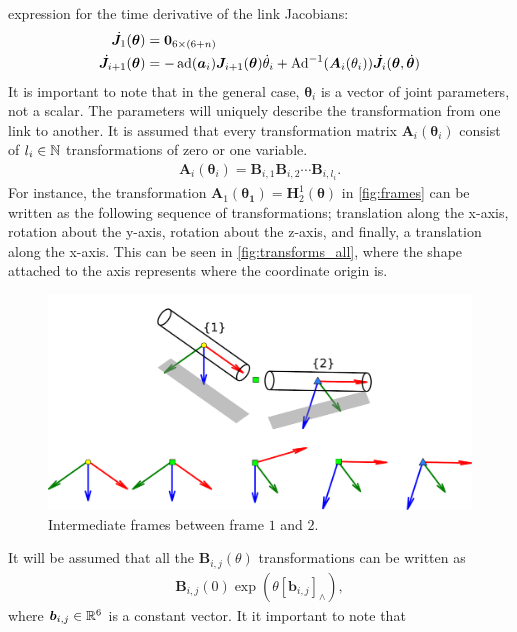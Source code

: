 expression for the time derivative of the link Jacobians:
\begin{align}
    \dot{\bm{J}}_1(\bm{\theta}) &= \bm{0}_{6\times(6+n)} \\
    \dot{\bm{J}}_{i+1}(\bm{\theta}) &= -\operatorname{ad}(\bm{a}_i)\bm{J}_{i+1}(\bm{\theta})\dot{\theta}_i +
        \operatorname{Ad}^{-1}(\bm{A}_i(\theta_i))\dot{\bm{J}}_i(\bm{\theta},\dot{\bm{\theta}})
\end{align}
It is important to note that in the general case, $\bm{\theta}_i$ is a vector of
joint parameters, not a scalar. The parameters will uniquely describe the transformation from one link
to another. It is assumed that every transformation matrix $\bm{A}_i(\bm{\theta}_i)$ consist of $l_i \in \mathbb{N}$ transformations
of zero or one variable.
\begin{align}
    \bm{A}_i(\bm{\theta}_i) = \bm{B}_{i,1} \bm{B}_{i,2} \cdots \bm{B}_{i,l_i}.
\end{align}
For instance, the transformation $\bm{A}_1(\bm{\bm{\theta}_1}) = \bm{H}_2^1(\bm{\theta})$
in \autoref{fig:frames} can be written as the following sequence of transformations;
translation along the x-axis, rotation about the y-axis, rotation about the z-axis, and finally,
a translation along the x-axis. This can be seen in \autoref{fig:transforms_all}, where the shape
attached to the axis represents where the coordinate origin is.
\begin{figure}[h!]
    \centering
    \includegraphics[width=\textwidth]{assets/transforms_all.pdf}
    \caption{Intermediate frames between frame $1$ and $2$.}
    \label{fig:transforms_all}
\end{figure}
It will be assumed that all the $\bm{B}_{i,j}(\theta)$ transformations can be written as
\begin{align}
    \bm{B}_{i,j}(0)\exp\left(\theta[\bm{b}_{i,j}]_{\wedge}\right),
\end{align}
where $\bm{b}_{i,j} \in \mathbb{R}^6$ is a constant vector. It it important to note that
